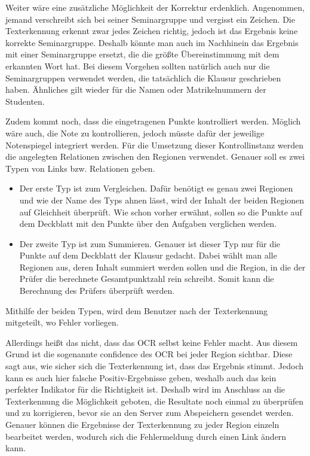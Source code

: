 \documentclass[nomenclature, oneside, 150]{HSMW-Thesis}
\begin{document}
	Weiter wäre eine zusätzliche Möglichkeit der Korrektur erdenklich. Angenommen, jemand verschreibt sich bei seiner Seminargruppe und vergisst ein Zeichen. Die Texterkennung erkennt zwar jedes Zeichen richtig, jedoch ist das Ergebnis keine korrekte Seminargruppe. Deshalb könnte man auch im Nachhinein das Ergebnis mit einer Seminargruppe ersetzt, die die größte Übereinstimmung mit dem erkannten Wort hat. Bei diesem Vorgehen sollten natürlich auch nur die Seminargruppen verwendet werden, die tatsächlich die Klausur geschrieben haben. Ähnliches gilt wieder für die Namen oder Matrikelnummern der Studenten.
	
	Zudem kommt noch, dass die eingetragenen Punkte kontrolliert werden. Möglich wäre auch, die Note zu kontrollieren, jedoch müsste dafür der jeweilige Notenspiegel integriert werden. Für die Umsetzung dieser Kontrollinstanz werden die angelegten Relationen zwischen den Regionen verwendet. Genauer soll es zwei Typen von Links bzw. Relationen geben.
		\begin{itemize}
			\item Der erste Typ ist zum Vergleichen. Dafür benötigt es genau zwei Regionen und wie der Name des Typs ahnen lässt, wird der Inhalt der beiden Regionen auf Gleichheit überprüft. Wie schon vorher erwähnt, sollen so die Punkte auf dem Deckblatt mit den Punkte über den Aufgaben verglichen werden.
			\item Der zweite Typ ist zum Summieren. Genauer ist dieser Typ nur für die Punkte auf dem Deckblatt der Klausur gedacht. Dabei wählt man alle Regionen aus, deren Inhalt summiert werden sollen und die Region, in die der Prüfer die berechnete Gesamtpunktzahl rein schreibt. Somit kann die Berechnung des Prüfers überprüft werden.
		\end{itemize} 
		Mithilfe der beiden Typen, wird dem Benutzer nach der Texterkennung mitgeteilt, wo Fehler vorliegen.
		
	Allerdings heißt das nicht, dass das OCR selbst keine Fehler macht. Aus diesem Grund ist die sogenannte confidence des OCR bei jeder Region sichtbar. Diese sagt aus, wie sicher sich die Texterkennung ist, dass das Ergebnis stimmt. Jedoch kann es auch hier falsche Positiv-Ergebnisse geben, weshalb auch das kein perfekter Indikator für die Richtigkeit ist. Deshalb wird im Anschluss an die Texterkennung die Möglichkeit geboten, die Resultate noch einmal zu überprüfen und zu korrigieren, bevor sie an den Server zum Abspeichern gesendet werden. Genauer können die Ergebnisse der Texterkennung zu jeder Region einzeln bearbeitet werden, wodurch sich die Fehlermeldung durch einen Link ändern kann.
\end{document}
